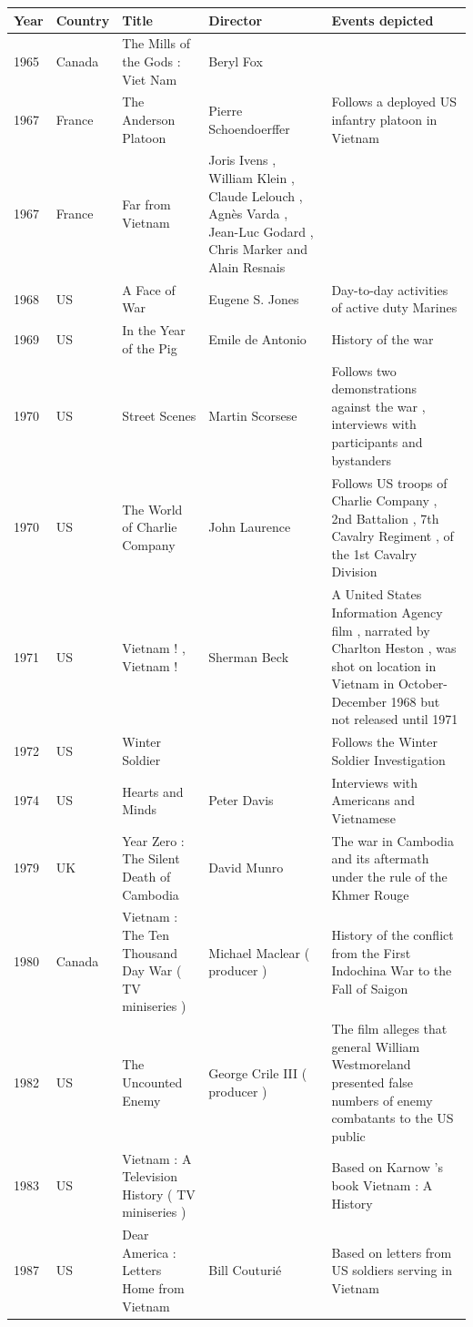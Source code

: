 \documentclass{article}
\begin{document}
\begin{tabular}{lllll}
\toprule
Year & Country & Title & Director & Events depicted \\
\midrule
1965 & Canada & The Mills of the Gods : Viet Nam & Beryl Fox &  \\
1967 & France & The Anderson Platoon & Pierre Schoendoerffer & Follows a deployed US infantry platoon in Vietnam \\
1967 & France & Far from Vietnam & Joris Ivens , William Klein , Claude Lelouch , Agnès Varda , Jean-Luc Godard , Chris Marker and Alain Resnais &  \\
1968 & US & A Face of War & Eugene S. Jones & Day-to-day activities of active duty Marines \\
1969 & US & In the Year of the Pig & Emile de Antonio & History of the war \\
1970 & US & Street Scenes & Martin Scorsese & Follows two demonstrations against the war , interviews with participants and bystanders \\
1970 & US & The World of Charlie Company & John Laurence & Follows US troops of Charlie Company , 2nd Battalion , 7th Cavalry Regiment , of the 1st Cavalry Division \\
1971 & US & Vietnam ! , Vietnam ! & Sherman Beck & A United States Information Agency film , narrated by Charlton Heston , was shot on location in Vietnam in October-December 1968 but not released until 1971 \\
1972 & US & Winter Soldier &  & Follows the Winter Soldier Investigation \\
1974 & US & Hearts and Minds & Peter Davis & Interviews with Americans and Vietnamese \\
1979 & UK & Year Zero : The Silent Death of Cambodia & David Munro & The war in Cambodia and its aftermath under the rule of the Khmer Rouge \\
1980 & Canada & Vietnam : The Ten Thousand Day War ( TV miniseries ) & Michael Maclear ( producer ) & History of the conflict from the First Indochina War to the Fall of Saigon \\
1982 & US & The Uncounted Enemy & George Crile III ( producer ) & The film alleges that general William Westmoreland presented false numbers of enemy combatants to the US public \\
1983 & US & Vietnam : A Television History ( TV miniseries ) &  & Based on Karnow 's book Vietnam : A History \\
1987 & US & Dear America : Letters Home from Vietnam & Bill Couturié & Based on letters from US soldiers serving in Vietnam \\

\end{tabular}
\end{document}
